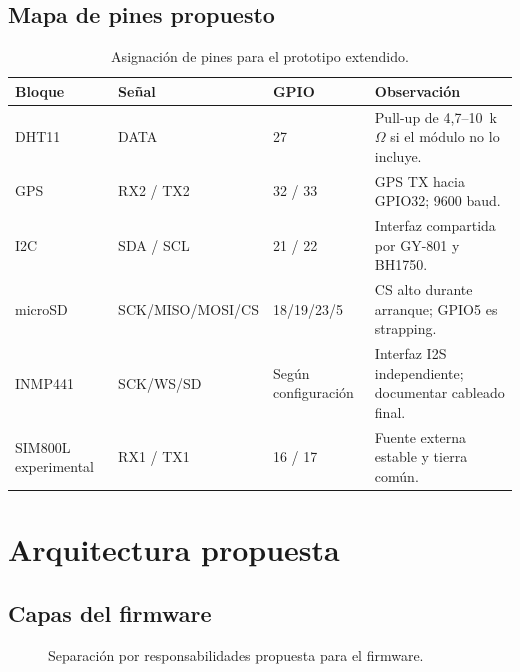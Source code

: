 \documentclass[11pt,a4paper,oneside]{report}
\begin{document}
\section{Mapa de pines propuesto}
\begin{table}[H]
\centering
\caption{Asignación de pines para el prototipo extendido.}
\begin{tabularx}{\textwidth}{@{}l l l Y@{}}
\toprule
\textbf{Bloque} & \textbf{Señal} & \textbf{GPIO} & \textbf{Observación}\\
\midrule
DHT11 & DATA & 27 & Pull-up de 4,7--10~k$\Omega$ si el módulo no lo incluye.\\
GPS & RX2 / TX2 & 32 / 33 & GPS TX hacia GPIO32; 9600 baud.\\
I2C & SDA / SCL & 21 / 22 & Interfaz compartida por GY-801 y BH1750.\\
microSD & SCK/MISO/MOSI/CS & 18/19/23/5 & CS alto durante arranque; GPIO5 es strapping.\\
INMP441 & SCK/WS/SD & Según configuración & Interfaz I2S independiente; documentar cableado final.\\
SIM800L experimental & RX1 / TX1 & 16 / 17 & Fuente externa estable y tierra común.\\
\bottomrule
\end{tabularx}
\end{table}

\chapter{Arquitectura propuesta}

\section{Capas del firmware}
\begin{figure}[H]
\centering
{}
\caption{Separación por responsabilidades propuesta para el firmware.}
\end{figure}
\end{document}

